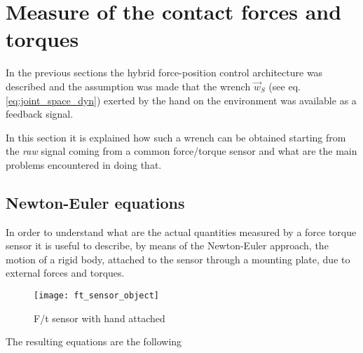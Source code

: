 \section{Measure of the contact forces and torques}
In the previous sections the hybrid force-position control architecture was described
and the assumption was made that the wrench $\vec{w}_{S}$ (see eq. \ref{eq:joint_space_dyn})
exerted by the hand on the environment was available as a feedback signal.
\par
In this section it is explained how such a wrench can be obtained starting from the \emph{raw} signal
coming from a common force/torque sensor and what are the main problems encountered in doing that.

\subsection{Newton-Euler equations}
In order to understand what are the actual quantities measured by a force torque sensor it is useful
to describe, by means of the Newton-Euler approach, the motion of a rigid body, attached to the
sensor through a mounting plate, due to external forces and torques.
\begin{figure}[h]
  \centering
  \texttt{[image: ft\_sensor\_object]}
  \caption{F/t sensor with hand attached \label{fig:ft_sensor_object}}
\end{figure}


The resulting equations are the following

